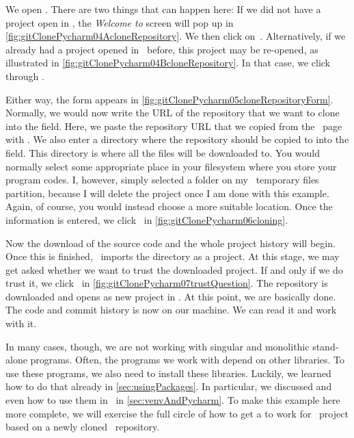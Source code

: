 We open \pycharm.
There are two things that can happen here:
If we did not have a project open in \pycharm, the \emph{Welcome to \pycharm} screen will pop up in \cref{fig:gitClonePycharm04AcloneRepository}.
We then click on~.
Alternatively, if we already had a project opened in \pycharm\ before, this project may be re-opened, as illustrated in \cref{fig:gitClonePycharm04BcloneRepository}.
In that case, we click through .

Either way, the  form appears in \cref{fig:gitClonePycharm05cloneRepositoryForm}.
Normally, we would now write the URL of the repository that we want to clone into the  field.
Here, we paste the repository URL that we copied from the \github\ page with .
We also enter a directory where the repository should be copied to into the  field.
This directory is where all the files will be downloaded to.
You would normally select some appropriate place in your filesystem where you store your program codes.
I, however, simply selected a folder on my \linux\ temporary files partition, because I will delete the project once I am done with this example.
Again, of course, you would instead choose a more suitable location.
Once the information is entered, we click~ in \cref{fig:gitClonePycharm06cloning}.

Now the download of the source code and the whole project history will begin.
Once this is finished, \pycharm\ imports the directory as a project.
At this stage, we may get asked whether we want to trust the downloaded project.
If and only if we do trust it, we click~ in \cref{fig:gitClonePycharm07trustQuestion}.
The repository is downloaded and opens as new project in \pycharm.
At this point, we are basically done.
The code and commit history is now on our machine.
We can read it and work with it.

In many cases, though, we are not working with singular and monolithic stand-alone programs.
Often, the programs we work with depend on other libraries.
To use these programs, we also need to install these libraries.
Luckily, we learned how to do that already in \cref{sec:usingPackages}.
In particular, we discussed  and even how to use them in \pycharm\ in \cref{sec:venvAndPycharm}.
To make this example here more complete, we will exercise the full circle of how to get a  to work for \pycharm\ project based on a newly cloned \github\ repository.

